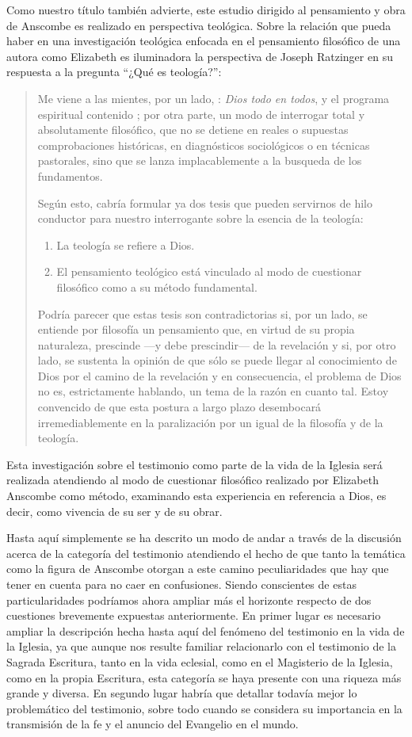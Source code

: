 Como nuestro título también advierte, este estudio dirigido al pensamiento y
obra de Anscombe es realizado en perspectiva teológica. Sobre la relación que
pueda haber en una investigación teológica enfocada en el pensamiento filosófico
de una autora como Elizabeth es iluminadora la perspectiva de Joseph Ratzinger
en su respuesta a la pregunta \enquote{¿Qué es teología?}:
\blockquote[{\cite[380]{ratzinger2005teoria}}]{Me viene a las mientes, por un
  lado, : \emph{Dios todo en todos}, y el programa
  espiritual contenido ; por otra parte, \textelp{} un modo de
  interrogar total y absolutamente filosófico, que no se detiene en reales o
  supuestas comprobaciones históricas, en diagnósticos sociológicos o en
  técnicas pastorales, sino que se lanza implacablemente a la busqueda de los
  fundamentos.

  Según esto, cabría formular ya dos tesis que pueden servirnos de hilo
  conductor para nuestro interrogante sobre la esencia de la teología:
  \begin{enumerate}
    \item La teología se refiere a Dios.
    \item El pensamiento teológico está vinculado al modo de cuestionar
      filosófico como a su método fundamental.
   \end{enumerate}

  Podría parecer que estas tesis son contradictorias si, por un lado, se
  entiende por filosofía un pensamiento que, en virtud de su propia
  naturaleza, prescinde ---y debe prescindir--- de la revelación y si, por
  otro lado, se sustenta la opinión de que sólo se puede llegar al
  conocimiento de Dios por el camino de la revelación y en consecuencia, el
  problema de Dios no es, estrictamente hablando, un tema de la razón en
  cuanto tal. Estoy convencido de que esta postura \textelp{} a largo plazo
  desembocará irremediablemente en la paralización por un igual de la
  filosofía y de la teología.}
Esta investigación sobre el testimonio como parte de la vida de la Iglesia será
realizada atendiendo al modo de cuestionar filosófico realizado por Elizabeth
Anscombe como método, examinando esta experiencia en referencia a Dios, es
decir, como vivencia de su ser y de su obrar.

Hasta aquí simplemente se ha descrito un modo de andar a través de la discusión
acerca de la categoría del testimonio atendiendo el hecho de que tanto la
temática como la figura de Anscombe otorgan a este camino peculiaridades que hay
que tener en cuenta para no caer en confusiones. Siendo conscientes de estas
particularidades podríamos ahora ampliar más el horizonte respecto de dos
cuestiones brevemente expuestas anteriormente. En primer lugar es necesario
ampliar la descripción hecha hasta aquí del fenómeno del testimonio en la vida
de la Iglesia, ya que aunque nos resulte familiar relacionarlo con el testimonio
de la Sagrada Escritura, tanto en la vida eclesial, como en el Magisterio de la
Iglesia, como en la propia Escritura, esta categoría se haya presente con una
riqueza más grande y diversa. En segundo lugar habría que detallar todavía mejor
lo problemático del testimonio, sobre todo cuando se considera su importancia en
la transmisión de la fe y el anuncio del Evangelio en el mundo.
